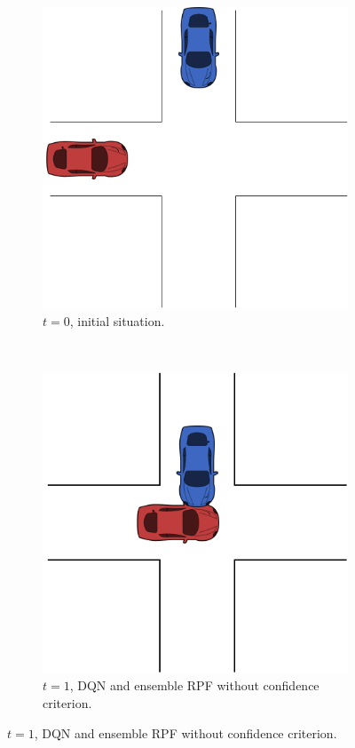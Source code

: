 \begin{figure}[!t]
	\centering
	\begin{subfigure}[t]{0.48\columnwidth}
		\centering
		\includegraphics[width=0.7\columnwidth]{figures/figures-scen1.pdf}
		\caption{$t=0$, initial situation.}
	\end{subfigure}%
	~ 
	\begin{subfigure}[t]{0.48\columnwidth}
		\centering
		\includegraphics[width=0.7\columnwidth]{figures/figures-scen2.pdf}
		\caption{$t=1$, DQN and ensemble RPF without confidence criterion.}
	\end{subfigure}
	
	\vspace{5pt}
	

\end{figure}
